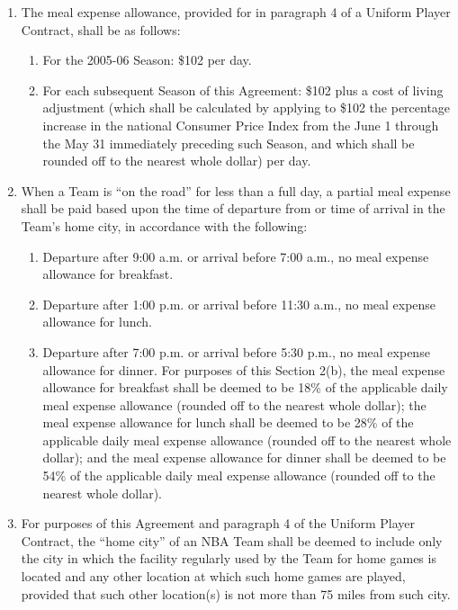\documentclass[
]{book}
\providecommand{\tightlist}{%
  \setlength{\itemsep}{0pt}\setlength{\parskip}{0pt}}
\begin{document}
\begin{enumerate}
\def\labelenumi{(\alph{enumi})}
\tightlist
\item
  The meal expense allowance, provided for in paragraph 4 of a Uniform Player Contract, shall be as follows:

  \begin{enumerate}
  \def\labelenumii{(\roman{enumii})}
  \tightlist
  \item
    For the 2005-06 Season: \$102 per day.
  \item
    For each subsequent Season of this Agreement: \$102 plus a cost of living adjustment (which shall be calculated by applying to \$102 the percentage increase in the national Consumer Price Index from the June 1 through the May 31 immediately preceding such Season, and which shall be rounded off to the nearest whole dollar) per day.
  \end{enumerate}
\item
  When a Team is ``on the road'' for less than a full day, a partial meal expense shall be paid based upon the time of departure from or time of arrival in the Team's home city, in accordance with the following:

  \begin{enumerate}
  \def\labelenumii{(\roman{enumii})}
  \tightlist
  \item
    Departure after 9:00 a.m. or arrival before 7:00 a.m., no meal expense allowance for breakfast.
  \item
    Departure after 1:00 p.m. or arrival before 11:30 a.m., no meal expense allowance for lunch.
  \item
    Departure after 7:00 p.m. or arrival before 5:30 p.m., no meal expense allowance for dinner.
    For purposes of this Section 2(b), the meal expense allowance for breakfast shall be deemed to be 18\% of the applicable daily meal expense allowance (rounded off to the nearest whole dollar); the meal expense allowance for lunch shall be deemed to be 28\% of the applicable daily meal expense allowance (rounded off to the nearest whole dollar); and the meal expense allowance for dinner shall be deemed to be 54\% of the applicable daily meal expense allowance (rounded off to the nearest whole dollar).
  \end{enumerate}
\item
  For purposes of this Agreement and paragraph 4 of the Uniform Player Contract, the ``home city'' of an NBA Team shall be deemed to include only the city in which the facility regularly used by the Team for home games is located and any other location at which such home games are played, provided that such other location(s) is not more than 75 miles from such city.
\end{enumerate}
\end{document}
